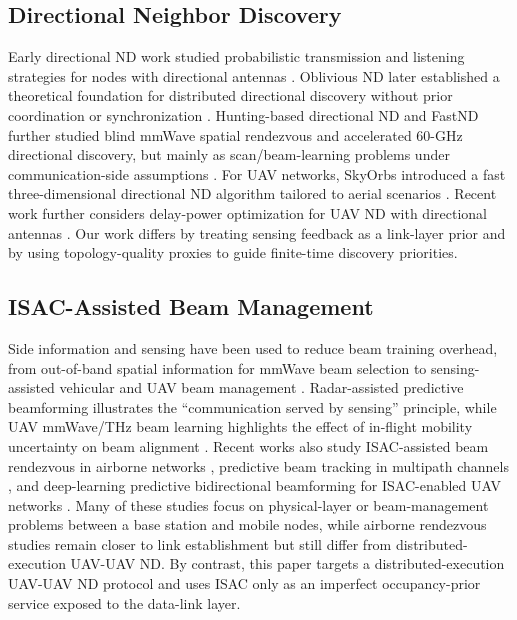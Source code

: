\documentclass[journal]{IEEEtran}
\begin{document}
\subsection{Directional Neighbor Discovery}
Early directional ND work studied probabilistic transmission and listening strategies for nodes with directional antennas \cite{Vasudevan2005DirectionalND}.
Oblivious ND later established a theoretical foundation for distributed directional discovery without prior coordination or synchronization \cite{Chen2017ObliviousND}.
Hunting-based directional ND and FastND further studied blind mmWave spatial rendezvous and accelerated 60-GHz directional discovery, but mainly as scan/beam-learning problems under communication-side assumptions \cite{Wang2017HDND,Zhou2018FastND}.
For UAV networks, SkyOrbs introduced a fast three-dimensional directional ND algorithm tailored to aerial scenarios \cite{SkyOrbs2024TMC}.
Recent work further considers delay-power optimization for UAV ND with directional antennas \cite{Fan2026DelayPowerND}.
Our work differs by treating sensing feedback as a link-layer prior and by using topology-quality proxies to guide finite-time discovery priorities.

\subsection{ISAC-Assisted Beam Management}
Side information and sensing have been used to reduce beam training overhead, from out-of-band spatial information for mmWave beam selection to sensing-assisted vehicular and UAV beam management \cite{Ali2018OutOfBand,Li2024SensingNRV2X,Cui2024SensingUAVBM}.
Radar-assisted predictive beamforming illustrates the ``communication served by sensing'' principle, while UAV mmWave/THz beam learning highlights the effect of in-flight mobility uncertainty on beam alignment \cite{Liu2020RadarPredictiveBF,Moorthy2022BeamLearningDrone}.
Recent works also study ISAC-assisted beam rendezvous in airborne networks \cite{Hong2024ISACRendezvous}, predictive beam tracking in multipath channels \cite{Cui2024MultipathISAC}, and deep-learning predictive bidirectional beamforming for ISAC-enabled UAV networks \cite{Xu2026PredictiveBidirectionalBF}.
Many of these studies focus on physical-layer or beam-management problems between a base station and mobile nodes, while airborne rendezvous studies remain closer to link establishment but still differ from distributed-execution UAV-UAV ND.
By contrast, this paper targets a distributed-execution UAV-UAV ND protocol and uses ISAC only as an imperfect occupancy-prior service exposed to the data-link layer.
\end{document}
